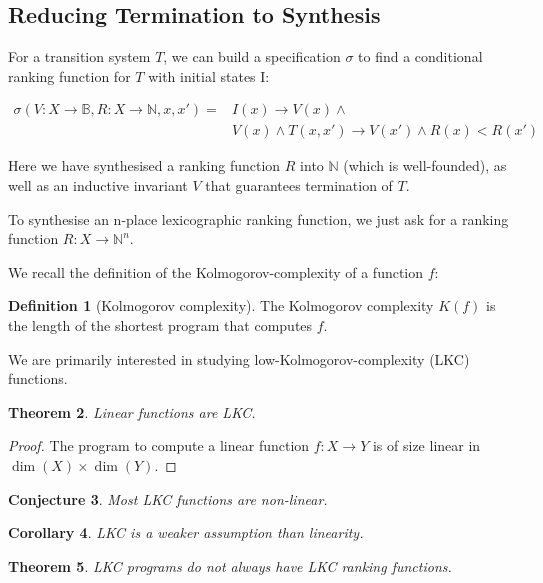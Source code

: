 \documentclass[preprint]{sigplanconf}
\newtheorem{theorem}{Theorem}
\newtheorem{corollary}[theorem]{Corollary}
\newtheorem{conjecture}[theorem]{Conjecture}
\theoremstyle{definition}
\newtheorem{definition}[theorem]{Definition}
\begin{document}
\subsection{Reducing Termination to Synthesis}
For a transition system $T$, we can build a specification $\sigma$ to find a conditional ranking function for
$T$ with initial states I:

\begin{eqnarray}
 \sigma(V: X \to \mathbb{B}, R: X \to \mathbb{N}, x, x') = & I(x) \rightarrow V(x) \wedge \\
 & V(x) \wedge T(x, x') \rightarrow V(x') \wedge R(x) < R(x') 
\end{eqnarray}

Here we have synthesised a ranking function $R$ into $\mathbb{N}$ (which is well-founded),
as well as an inductive invariant $V$ that guarantees termination of $T$.

To synthesise an n-place lexicographic ranking function, we just ask for a ranking function
$R: X \to \mathbb{N}^n$.

We recall the definition of the Kolmogorov-complexity of a function $f$:

\begin{definition}[Kolmogorov complexity]
 The Kolmogorov complexity $K(f)$ is the length of the shortest program that
 computes $f$.
\end{definition}

We are primarily interested in studying low-Kolmogorov-complexity (LKC)
functions.

\begin{theorem}
 Linear functions are LKC.
\end{theorem}

\begin{proof}
 The program to compute a linear function $f: X \to Y$ is of size linear in
 $\dim(X) \times \dim(Y)$.
\end{proof}


\begin{conjecture}
 Most LKC functions are non-linear.
\end{conjecture}

\begin{corollary}
 LKC is a weaker assumption than linearity.
\end{corollary}


\begin{theorem}
 LKC programs do not always have LKC ranking functions.
\end{theorem}
\end{document}
